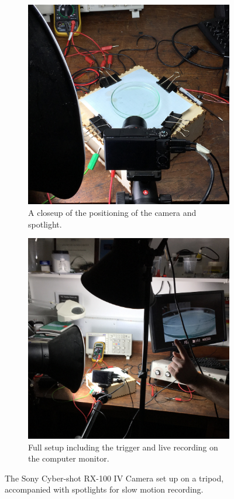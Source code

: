 \begin{figure}[ht]
\centering
    \begin{subfigure}[t]{0.475\textwidth}
    \centering
        \includegraphics[width=\textwidth]{prototype/exp_rep_imgs/closeup_slowmo_setup.jpg}
        \caption{A closeup of the positioning of the camera and spotlight.}
    \end{subfigure}
    \begin{subfigure}[t]{0.475\textwidth}
    \centering
        \includegraphics[width=\textwidth]{prototype/exp_rep_imgs/slowmo_setup.jpg}
        \caption{Full setup including the trigger and live recording on the computer monitor.}
    \end{subfigure}
\caption{The Sony Cyber-shot RX-100 IV Camera set up on a tripod, accompanied with spotlights for slow motion recording. }
\label{fig:slowmo_setup}
\end{figure}

